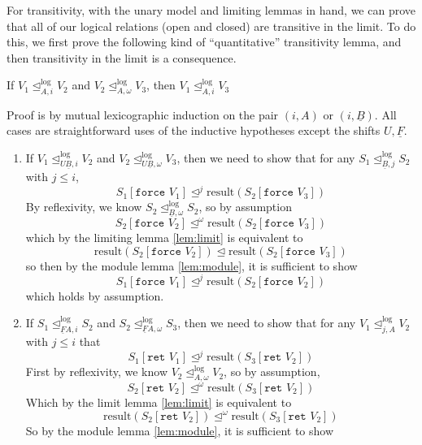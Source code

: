 \documentclass[acmsmall,screen,12pt]{acmart}
\newif\ifshort
\newif\iflong
\renewcommand{\u}{\underline}
\newcommand{\apreorder}{\trianglelefteq}
\newcommand{\ix}[2]{\mathrel{#1^{#2}}}
\newcommand{\itylrof}[3]{\ilrof{#1}{#3,#2}}
\newcommand{\ilrof}[2]{\mathrel{{#1}^{\text{log}}_{#2}}}
\newcommand{\itylr}[2]{\itylrof{\apreorder}{#1}{#2}}
\newcommand{\result}{\text{result}}
\newcommand{\kw}[1]{\texttt{#1}\,\,}
\newcommand{\ret}{\kw{ret}}
\newcommand{\force}{\kw{force}}
\begin{document}
{For transitivity, with the unary model and limiting lemmas in hand, we
can prove that all of our logical relations (open and closed) are
transitive in the limit. To do this, we first prove the following kind
of ``quantitative'' transitivity lemma, and then transitivity in the
limit is a consequence.
\begin{lemma} \hfill
  
  \iflong
  \begin{enumerate}
  \item
  \fi
    If $V_1 \itylr i A V_2$ and $V_2 \itylr
    \omega A V_3$, then $V_1 \itylr i A V_3$\ifshort, and analogously
    for stacks. \fi
  \iflong
  \item If $S_1 \itylr i {\u B} S_2$ and $S_2 \itylr
    \omega {\u B} S_3$, then $S_1 \itylr i {\u B} S_3$
  \end{enumerate}
    \fi
\end{lemma}
\begin{longproof}
  Proof is by mutual lexicographic induction on the pair $(i, A)$ or
  $(i, \u B)$. All cases are straightforward uses of the inductive
  hypotheses except the shifts $U, \u F$.
  \begin{enumerate}
  \item If $V_1 \itylr i {U \u B} V_2$ and $V_2
    \itylr \omega {U \u B} V_3$, then we need to show that
    for any $S_1 \itylr j {\u B} S_2$ with $j \leq i$,
    \[ S_1[\force V_1] \ix\apreorder j \result(S_2[\force V_3]) \]
    By reflexivity, we know $S_2 \itylr \omega {\u B} S_2$, so by assumption
    \[ S_2[\force V_2] \ix\apreorder \omega \result(S_2[\force V_3])\]
    which by the limiting lemma \ref{lem:limit} is equivalent to
    \[ \result(S_2[\force V_2]) \apreorder \result(S_2[\force V_3]) \]
    so then by the module lemma \ref{lem:module}, it is sufficient to show
    \[ S_1[\force V_1] \ix\apreorder j \result(S_2[\force V_2]) \]
    which holds by assumption.
  \item If $S_1 \itylr i {\u F A} S_2$ and $S_2 \itylr \omega {\u F A}
    S_3$, then we need to show that for any $V_1 \itylr A j V_2$ with $j \leq i$ that
    \[ S_1[\ret V_1] \ix\apreorder j \result(S_3[\ret V_2])\]
    First by reflexivity, we know $V_2 \itylr \omega A V_2$, so by assumption,
    \[ S_2[\ret V_2] \ix\apreorder \omega \result(S_3[\ret V_2]) \]
    Which by the limit lemma \ref{lem:limit} is equivalent to
    \[ \result(S_2[\ret V_2]) \ix\apreorder \omega \result(S_3[\ret V_2]) \]
    So by the module lemma \ref{lem:module}, it is sufficient to show

\end{enumerate}
\end{longproof}}
\end{document}
